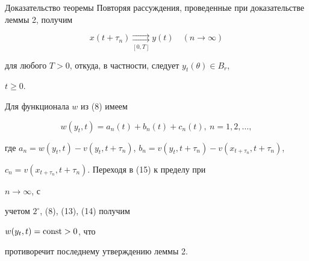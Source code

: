 \begin{pf*}{Доказательство теоремы}
Повторяя рассуждения, проведенные при доказательстве леммы 2, получим


\begin{equation}


x(t+\tau_n)\underset{[0,T]}{\rightrightarrows}{} y(t)\quad


(n\to\infty)


\end{equation}


для любого $T>0$, откуда, в частности, следует $y_t(\theta)\in B_r$,


$t\geqslant 0$.


Для функционала $w$ из (8) имеем


\begin{equation}


w(y_t,t)=a_n(t)+b_n(t)+c_n(t),\ n=1,2,\dotsc,


\end{equation}


где $a_n=w(y_t,t)-v(y_t,t+\tau_n)$, $b_n=v(y_t,t+\tau_n)-


v(x_{t+\tau_n},t+\tau_n)$,


$c_n=v(x_{t+\tau_n},t+\tau_n)$. Переходя в (15) к пределу при


$n\to\infty$, с


учетом $2^{\circ}$, (8), (13), (14) получим


$w(y_t,t)=\operatorname{const}>0$, что


противоречит последнему утверждению леммы 2.


\end{pf*}





